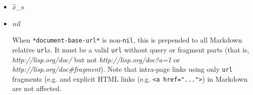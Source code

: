 \begin{itemize}
\item
  \label{x-28MGL-PAX-TEST-3AFN-WITH-MATHJAX-20FUNCTION-29}

  \(\hat{x}\)\_s
\item
  \label{x-28MGL-PAX-3A-2ADOCUMENT-BASE-URL-2A-20VARIABLE-29}
  \emph{nil}

  When \texttt{*document-base-url*} is non-\texttt{nil}, this is
  prepended to all Markdown relative \texttt{url}s. It must be a valid
  \texttt{url} without query or fragment parts (that is,
  \emph{http://lisp.org/doc/} but not \emph{http://lisp.org/doc?a=1} or
  \emph{http://lisp.org/doc\#fragment}). Note that intra-page links
  using only \texttt{url} fragments (e.g. and explicit HTML links (e.g.
  \texttt{\textless{}a\ href="..."\textgreater{}}) in Markdown are not
  affected.
\end{itemize}
